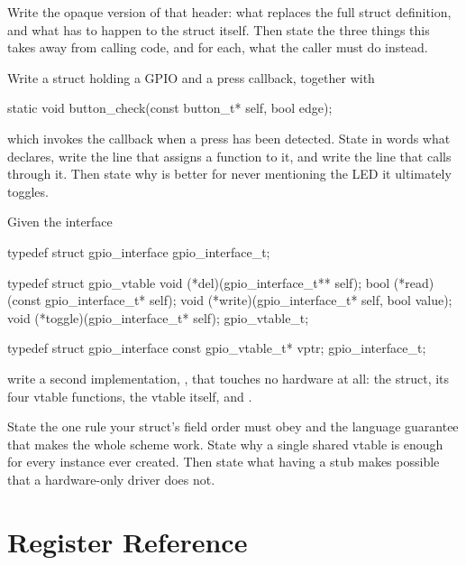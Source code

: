 Write the opaque version of that header: what replaces the full struct definition, and what has to
happen to the struct itself. Then state the three things this takes away from calling code, and for
each, what the caller must do instead. 

 Write a  struct holding a GPIO and a press callback, together with

\begin{ccode}
static void button_check(const button_t* self, bool edge);
\end{ccode}

\noindent which invokes the callback when a press has been detected. State in words what
 declares, write the line that assigns a function to it, and write the
line that calls through it. Then state why  is better for never mentioning the
LED it ultimately toggles. 

 Given the interface

\begin{ccode}
typedef struct gpio_interface gpio_interface_t;

typedef struct gpio_vtable
{
    void (*del)(gpio_interface_t** self);
    bool (*read)(const gpio_interface_t* self);
    void (*write)(gpio_interface_t* self, bool value);
    void (*toggle)(gpio_interface_t* self);
} gpio_vtable_t;

typedef struct gpio_interface
{
    const gpio_vtable_t* vptr;
} gpio_interface_t;
\end{ccode}

\noindent write a second implementation, , that touches no hardware at all: the
struct, its four vtable functions, the vtable itself, and .

State the one rule your struct's field order must obey and the language guarantee that makes the
whole scheme work. State why a single shared vtable is enough for every instance ever created. Then
state what having a stub makes possible that a hardware-only driver does not. 

\section*{Register Reference}
\label{exb:sec:registers}

